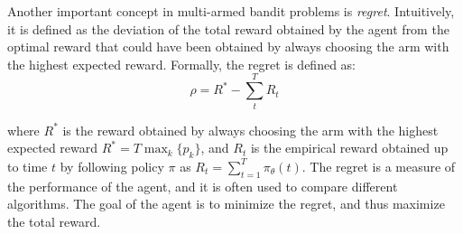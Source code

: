 Another important concept in multi-armed bandit problems is \textit{regret}. Intuitively, it is defined as the deviation of the total reward obtained by the agent from the optimal reward that could have been obtained by always choosing the arm with the highest expected reward.
Formally, the regret is defined as:
\begin{equation}
    \rho=R^{*} - \sum^{T}_{t} R_{t}
\end{equation}

\noindent where $R^{*}$ is the reward obtained by always choosing the arm with the highest expected reward $R^{*}=T\max_{k}\{p_{k}\}$, and $R_{t}$ is the empirical reward obtained up to time $t$ by following policy $\pi$ as $R_{t}=\sum^{T}_{t=1}\pi_{\theta}(t)$.
The regret is a measure of the performance of the agent, and it is often used to compare different algorithms. The goal of the agent is to minimize the regret, and thus maximize the total reward.



